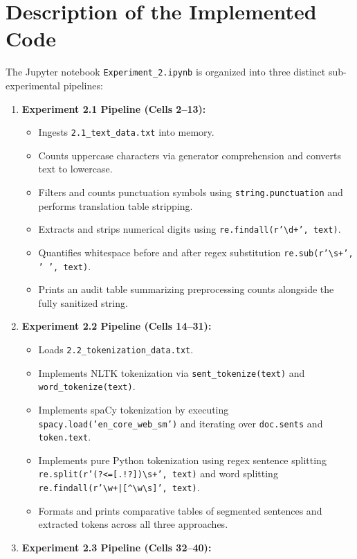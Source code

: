 \documentclass[12pt,a4paper]{report}
\begin{document}
\section{Description of the Implemented Code}
The Jupyter notebook \texttt{Experiment\_2.ipynb} is organized into three distinct sub-experimental pipelines:
\begin{enumerate}
    \item \textbf{Experiment 2.1 Pipeline (Cells 2--13):}
    \begin{itemize}
        \item Ingests \texttt{2.1\_text\_data.txt} into memory.
        \item Counts uppercase characters via generator comprehension and converts text to lowercase.
        \item Filters and counts punctuation symbols using \texttt{string.punctuation} and performs translation table stripping.
        \item Extracts and strips numerical digits using \texttt{re.findall(r'\textbackslash d+', text)}.
        \item Quantifies whitespace before and after regex substitution \texttt{re.sub(r'\textbackslash s+', ' ', text)}.
        \item Prints an audit table summarizing preprocessing counts alongside the fully sanitized string.
    \end{itemize}
    \item \textbf{Experiment 2.2 Pipeline (Cells 14--31):}
    \begin{itemize}
        \item Loads \texttt{2.2\_tokenization\_data.txt}.
        \item Implements NLTK tokenization via \texttt{sent\_tokenize(text)} and \texttt{word\_tokenize(text)}.
        \item Implements spaCy tokenization by executing \texttt{spacy.load('en\_core\_web\_sm')} and iterating over \texttt{doc.sents} and \texttt{token.text}.
        \item Implements pure Python tokenization using regex sentence splitting \texttt{re.split(r'(?<=[.!?])\textbackslash s+', text)} and word splitting \texttt{re.findall(r'\textbackslash w+|[\textasciicircum\textbackslash w\textbackslash s]', text)}.
        \item Formats and prints comparative tables of segmented sentences and extracted tokens across all three approaches.
    \end{itemize}
    \item \textbf{Experiment 2.3 Pipeline (Cells 32--40):}

\end{enumerate}
\end{document}
